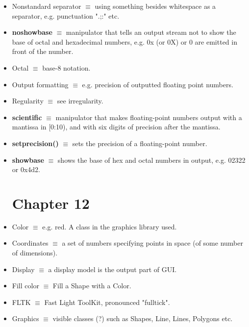 \documentclass[12pt]{article}
\begin{document}
\begin{itemize}
\item Nonstandard separator $\equiv$ using something besides whitespace as a separator, e.g. punctuation ".;:" etc.

\item \textbf{noshowbase} $\equiv$ manipulator that tells an output stream not to show the base of octal and hexadecimal numbers, e.g. 0x (or 0X) or 0 are emitted in front of the number.

\item Octal $\equiv$ base-8 notation.

\item Output formatting $\equiv$ e.g. precision of outputted floating point numbers.

\item Regularity $\equiv$ see irregularity.

\item \textbf{scientific} $\equiv$ manipulator that makes floating-point numbers output with a mantissa in [0:10), and with six digits of precision after the mantissa.

\item \textbf{setprecision()} $\equiv$ sets the precision of a floating-point number.

\item \textbf{showbase} $\equiv$ shows the base of hex and octal numbers in output, e.g. 02322 or 0x4d2.

\section*{Chapter 12}

\item Color $\equiv$ e.g. red. A class in the graphics library used.

\item Coordinates $\equiv$ a set of numbers specifying points in space (of some number of dimensions).

\item Display $\equiv$ a display model is the output part of GUI.

\item Fill color $\equiv$ Fill a Shape with a Color.

\item FLTK $\equiv$ Fast Light ToolKit, pronounced "fulltick". 

\item Graphics $\equiv$ visible classes (?) such as Shapes, Line, Lines, Polygons etc.


\end{itemize}
\end{document}
